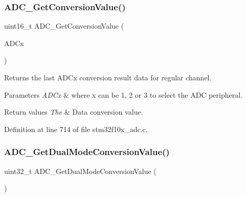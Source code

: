 \subsubsection{\texorpdfstring{A\+D\+C\+\_\+\+Get\+Conversion\+Value()}{ADC\_GetConversionValue()}}
{\footnotesize\ttfamily uint16\+\_\+t A\+D\+C\+\_\+\+Get\+Conversion\+Value (\begin{DoxyParamCaption}\item[{\hyperlink{struct_a_d_c___type_def}{A\+D\+C\+\_\+\+Type\+Def} $\ast$}]{A\+D\+Cx }\end{DoxyParamCaption})}



Returns the last A\+D\+Cx conversion result data for regular channel. 


\begin{DoxyParams}{Parameters}
{\em A\+D\+Cx} & where x can be 1, 2 or 3 to select the A\+DC peripheral. \\
\hline
\end{DoxyParams}

\begin{DoxyRetVals}{Return values}
{\em The} & Data conversion value. \\
\hline
\end{DoxyRetVals}


Definition at line 714 of file stm32f10x\+\_\+adc.\+c.

\mbox{\label{group___a_d_c___exported___functions_gac5a4792dc29ef7ff6bfbce9f37e8a668}} 
\subsubsection{\texorpdfstring{A\+D\+C\+\_\+\+Get\+Dual\+Mode\+Conversion\+Value()}{ADC\_GetDualModeConversionValue()}}
{\footnotesize\ttfamily uint32\+\_\+t A\+D\+C\+\_\+\+Get\+Dual\+Mode\+Conversion\+Value (\begin{DoxyParamCaption}\item[{void}]{ }\end{DoxyParamCaption})}



